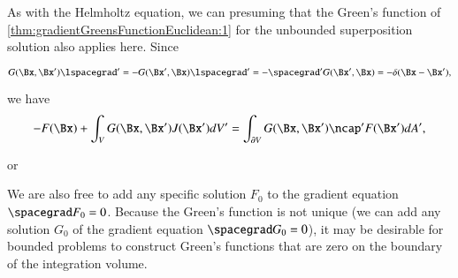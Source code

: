 As with the Helmholtz equation, we can presuming that the Green's function of
\cref{thm:gradientGreensFunctionEuclidean:1}
for the unbounded superposition solution also applies here.  Since

\begin{dmath}\label{eqn:greensFunctionGradient:520}
G(\Bx, \Bx') \lspacegrad'
=
-G(\Bx', \Bx) \lspacegrad'
=
-
\spacegrad' G(\Bx', \Bx)
= -\delta(\Bx - \Bx'),
\end{dmath}

we have
\begin{dmath}\label{eqn:greensFunctionGradient:540}
-F(\Bx)
+
\int_V G(\Bx, \Bx') J(\Bx') dV'
=
\int_{\partial V} G(\Bx, \Bx') \ncap' F(\Bx') dA',
\end{dmath}

or

We are also free to add any specific solution \( F_0 \) to the gradient equation \( \spacegrad F_0 = 0 \).
Because the Green's function is not unique (we can add any solution \( G_0 \) of the gradient equation \( \spacegrad G_0 = 0 \)),
it may be desirable for bounded problems to construct Green's functions that are zero on the boundary of the integration volume.

